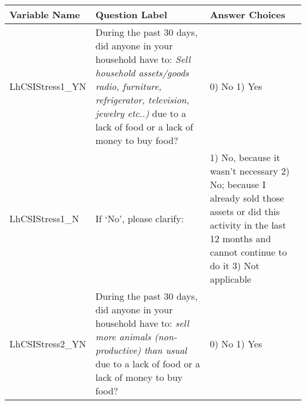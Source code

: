 \documentclass[
]{article}
\begin{document}
\begin{longtable}[]{@{}lll@{}}
\toprule
\begin{minipage}[b]{0.15\columnwidth}\raggedright
Variable Name\strut
\end{minipage} & \begin{minipage}[b]{0.49\columnwidth}\raggedright
Question Label\strut
\end{minipage} & \begin{minipage}[b]{0.27\columnwidth}\raggedright
Answer Choices\strut
\end{minipage}\tabularnewline
\midrule
\endhead
\begin{minipage}[t]{0.15\columnwidth}\raggedright
LhCSIStress1\_YN\strut
\end{minipage} & \begin{minipage}[t]{0.49\columnwidth}\raggedright
During the past 30 days, did anyone in your household have to: \emph{Sell household assets/goods radio, furniture, refrigerator, television, jewelry etc..)} due to a lack of food or a lack of money to buy food?\strut
\end{minipage} & \begin{minipage}[t]{0.27\columnwidth}\raggedright
0) No 1) Yes\strut
\end{minipage}\tabularnewline
\begin{minipage}[t]{0.15\columnwidth}\raggedright
LhCSIStress1\_N\strut
\end{minipage} & \begin{minipage}[t]{0.49\columnwidth}\raggedright
If `No', please clarify:\strut
\end{minipage} & \begin{minipage}[t]{0.27\columnwidth}\raggedright
1) No, because it wasn't necessary 2) No; because I already sold those assets or did this activity in the last 12 months and cannot continue to do it 3) Not applicable\strut
\end{minipage}\tabularnewline
\begin{minipage}[t]{0.15\columnwidth}\raggedright
LhCSIStress2\_YN\strut
\end{minipage} & \begin{minipage}[t]{0.49\columnwidth}\raggedright
During the past 30 days, did anyone in your household have to: \emph{sell more animals (non-productive) than usual} due to a lack of food or a lack of money to buy food?\strut
\end{minipage} & \begin{minipage}[t]{0.27\columnwidth}\raggedright
0) No 1) Yes\strut

\end{minipage}
\end{longtable}
\end{document}
